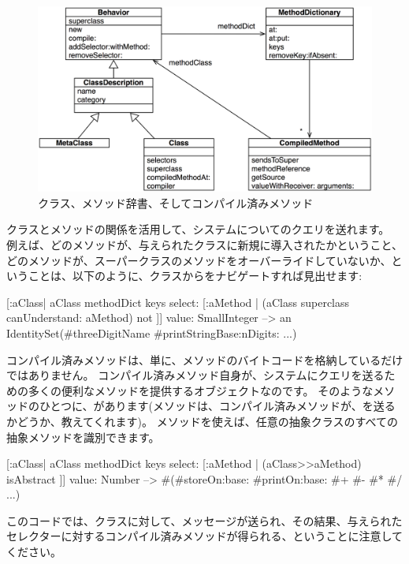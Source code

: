 \documentclass[a4paper,10pt,twoside]{book}
\begin{document}
\begin{figure}[ht]\centering
	\includegraphics[width=\linewidth]{MethodsAsObjects}
	\caption{クラス、メソッド辞書、そしてコンパイル済みメソッド}
\end{figure}

クラスとメソッドの関係を活用して、システムについてのクエリを送れます。
例えば、どのメソッドが、与えられたクラスに新規に導入されたかということ、\ie どのメソッドが、スーパークラスのメソッドをオーバーライドしていないか、ということは、以下のように、クラスからをナビゲートすれば見出せます:
\begin{code}{}
[:aClass| aClass methodDict keys select: [:aMethod |
  (aClass superclass canUnderstand: aMethod) not ]] value: SmallInteger
  --> an IdentitySet(#threeDigitName #printStringBase:nDigits: ...)
\end{code}

コンパイル済みメソッドは、単に、メソッドのバイトコードを格納しているだけではありません。
コンパイル済みメソッド自身が、システムにクエリを送るための多くの便利なメソッドを提供するオブジェクトなのです。
そのようなメソッドのひとつに、があります(メソッドは、コンパイル済みメソッドが、を送るかどうか、教えてくれます)。
メソッドを使えば、任意の抽象クラスのすべての抽象メソッドを識別できます。
\begin{code}{}
[:aClass| aClass methodDict keys select: [:aMethod |
  (aClass>>aMethod) isAbstract ]] value: Number
  --> #(#storeOn:base: #printOn:base: #+ #- #* #/ ...)
\end{code}
このコードでは、クラスに対して、\ct{>>}メッセージが送られ、その結果、与えられたセレクターに対するコンパイル済みメソッドが得られる、ということに注意してください。
\end{document}
